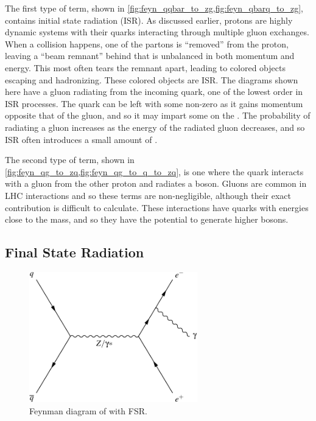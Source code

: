 The first type of term, shown in
\cref{fig:feyn_qqbar_to_zg,fig:feyn_qbarq_to_zg}, contains initial state
radiation (ISR). As discussed earlier, protons are highly dynamic systems with
their quarks interacting through multiple gluon exchanges. When a collision
happens, one of the partons is ``removed'' from the proton, leaving a ``beam
remnant'' behind that is unbalanced in both momentum and energy. This most
often tears the remnant apart, leading to colored objects escaping and
hadronizing. These colored objects are ISR. The diagrams shown here have a
gluon radiating from the incoming quark, one of the lowest order in
\alphastrong ISR processes. The quark can be left with some non-zero \pt as it
gains momentum opposite that of the gluon, and so it may impart some \bosonpt
on the \Z. The probability of radiating a gluon increases as the energy of the
radiated gluon decreases, and so ISR often introduces a small amount of
\bosonpt.

The second type of term, shown in
\cref{fig:feyn_qg_to_zq,fig:feyn_qg_to_q_to_zq}, is one where the quark
interacts with a gluon from the other proton and radiates a \Z boson. Gluons
are common in LHC interactions and so these terms are non-negligible, although
their exact contribution is difficult to calculate. These interactions have
quarks with energies close to the \Z mass, and so they have the potential to
generate higher \pt \Z bosons.



\subsection{Final State Radiation}
\label{sec:electron_dressing}

\begin{figure}[!htb]
    \centering
    \includegraphics[width=0.65\textwidth]{figures/feyn_fsr.pdf}
    \caption{
        Feynman diagram of \Ztoll with FSR.
    }
    \label{fig:fsr_diagram}
\end{figure}

